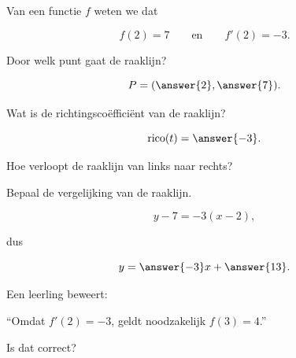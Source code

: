 \documentclass{ximera}
\begin{document}
\begin{oefening} {\oefB \ESS}

Van een functie $f$ weten we dat

\[
f(2)=7
\qquad\text{en}\qquad
f'(2)=-3.
\]

\begin{question}

Door welk punt gaat de raaklijn?

\[
P=(\answer{2},\answer{7}).
\]

\end{question}

\begin{question}

Wat is de richtingscoëfficiënt van de raaklijn?

\[
\operatorname{rico}(t)=\answer{-3}.
\]

\end{question}

\begin{question}

Hoe verloopt de raaklijn van links naar rechts?

\begin{multipleChoice}
\end{multipleChoice}

\end{question}

\begin{question}

Bepaal de vergelijking van de raaklijn.

\[
y-7=-3(x-2),
\]

dus

\[
y=\answer{-3}x+\answer{13}.
\]

\end{question}

\begin{question}

Een leerling beweert:

\begin{center}
``Omdat $f'(2)=-3$, geldt noodzakelijk $f(3)=4$.''
\end{center}

Is dat correct?

\begin{multipleChoice}



\end{multipleChoice}

\end{question}

\end{oefening}
\end{document}
